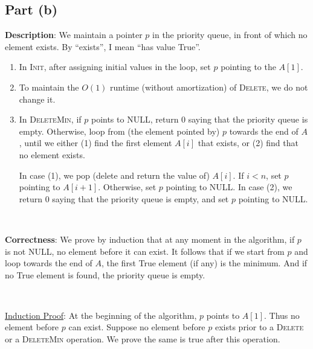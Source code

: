 \documentclass{article}
\begin{document}
\subsection{Part (b)}
\noindent\textbf{Description}:
We maintain a pointer $p$ in the priority queue, in front of which no element exists. By ``exists'', I mean ``has value True''.
\begin{enumerate}
\item In \textsc{Init}, after assigning initial values in the loop, set $p$ pointing to the $A[1]$.
\item To maintain the $O(1)$ runtime (without amortization) of \textsc{Delete}, we do not change it.
\item In \textsc{DeleteMin}, if $p$ points to NULL, return 0 saying that the priority queue is empty. Otherwise, loop from (the element pointed by) $p$ towards the end of $A$, until we either (1) find the first element $A[i]$ that exists, or (2) find that no element exists.

In case (1), we pop (delete and return the value of) $A[i]$. If $i<n$, set $p$ pointing to $A[i+1]$. Otherwise, set $p$ pointing to NULL. In case (2), we return 0 saying that the priority queue is empty, and set $p$ pointing to NULL.
\end{enumerate}

~

\noindent\textbf{Correctness}:
We prove by induction that at any moment in the algorithm, if $p$ is not NULL, no element before it can exist. It follows that if we start from $p$ and loop towards the end of $A$, the first True element (if any) is the minimum. And if no True element is found, the priority queue is empty.

~

\noindent\underline{Induction Proof}:
At the beginning of the algorithm, $p$ points to $A[1]$. Thus no element before $p$ can exist. Suppose no element before $p$ exists prior to a \textsc{Delete} or a \textsc{DeleteMin} operation. We prove the same is true after this operation.
\end{document}
